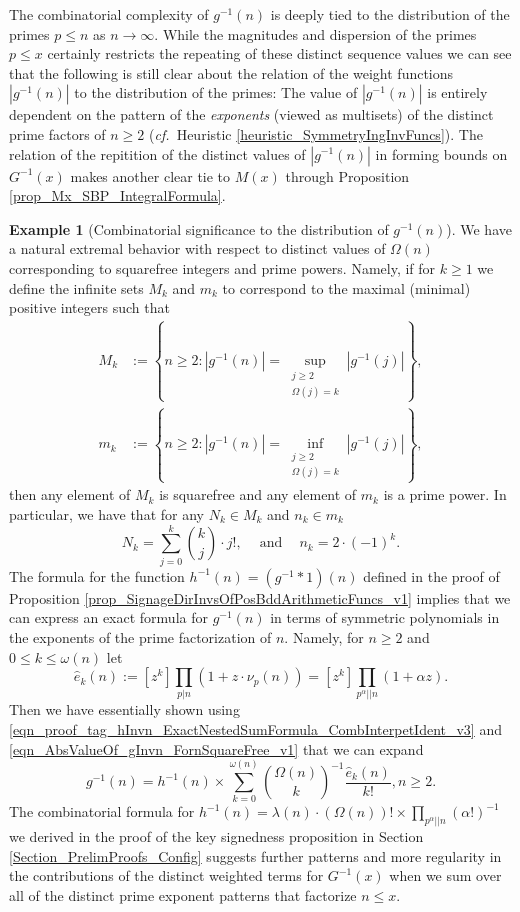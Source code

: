 \documentclass[11pt,reqno,a4letter]{article}
\numberwithin{figure}{section}
\numberwithin{table}{section}
\newcommand{\cf}{\textit{cf.\ }}
\theoremstyle{plain}
\numberwithin{theorem}{section}
\theoremstyle{definition}
\newtheorem{example}[theorem]{Example}
\begin{document}
The combinatorial complexity of $g^{-1}(n)$ is deeply tied to the distribution of the primes 
$p \leq n$ as $n \rightarrow \infty$. 
While the magnitudes and dispersion of the primes $p \leq x$ certainly restricts the 
repeating of these distinct sequence 
values we can see that the following 
is still clear about the relation of the weight functions $|g^{-1}(n)|$ to the 
distribution of the primes: 
The value of $|g^{-1}(n)|$ is entirely dependent on the pattern of the \emph{exponents} 
(viewed as multisets) of the distinct prime factors of $n \geq 2$ 
(\cf Heuristic \ref{heuristic_SymmetryIngInvFuncs}). 
The relation of the repitition of the distinct values 
of $|g^{-1}(n)|$ in forming bounds on $G^{-1}(x)$ makes another clear tie to 
$M(x)$ through Proposition \ref{prop_Mx_SBP_IntegralFormula}. 

\begin{example}[Combinatorial significance to the distribution of $g^{-1}(n)$] 
We have a natural extremal behavior with respect to distinct values of $\Omega(n)$ 
corresponding to squarefree integers and prime powers. Namely, if for $k \geq 1$ we define the 
infinite sets $M_k$ and $m_k$ to correspond to the maximal (minimal) positive integers such that 
\begin{align*} 
M_k & := \left\{n \geq 2: |g^{-1}(n)| = \underset{{\substack{j \geq 2 \\ \Omega(j) = k}}}{\operatorname{sup}} 
     |g^{-1}(j)|\right\}, \\  
m_k & := \left\{n \geq 2: |g^{-1}(n)| = \underset{{\substack{j \geq 2 \\ \Omega(j) = k}}}{\operatorname{inf}} 
     |g^{-1}(j)|\right\}, 
\end{align*} 
then any element of $M_k$ is squarefree and any element of $m_k$ is a prime power. 
In particular, we have that for any $N_k \in M_k$ and $n_k \in m_k$
\[
N_k = \sum_{j=0}^{k} \binom{k}{j} \cdot j!, \quad \mathrm{\ and\ } \quad n_k = 2 \cdot (-1)^{k}. 
\]
The formula for the function $h^{-1}(n) = (g^{-1} \ast 1)(n)$ defined in the proof of 
Proposition \ref{prop_SignageDirInvsOfPosBddArithmeticFuncs_v1} implies that we can express 
an exact formula for $g^{-1}(n)$ in terms of symmetric polynomials in the 
exponents of the prime factorization of $n$. 
Namely, for $n \geq 2$ and $0 \leq k \leq \omega(n)$ let 
\[
\widehat{e}_k(n) := [z^k] \prod_{p|n} (1 + z \cdot \nu_p(n)) = [z^k] \prod_{p^{\alpha} || n} (1 + \alpha z). 
\]
Then we have essentially shown using 
\eqref{eqn_proof_tag_hInvn_ExactNestedSumFormula_CombInterpetIdent_v3} and 
\eqref{eqn_AbsValueOf_gInvn_FornSquareFree_v1} that we can expand 
\[
g^{-1}(n) = h^{-1}(n) \times \sum_{k=0}^{\omega(n)} \binom{\Omega(n)}{k}^{-1} 
     \frac{\widehat{e}_k(n)}{k!}, n \geq 2. 
\]
The combinatorial formula for 
$h^{-1}(n) = \lambda(n) \cdot (\Omega(n))! \times \prod_{p^{\alpha} || n} (\alpha !)^{-1}$ 
we derived in the proof of the key signedness proposition in 
Section \ref{Section_PrelimProofs_Config} 
suggests further patterns and more regularity in the contributions of the distinct weighted 
terms for $G^{-1}(x)$ when we sum over all of the distinct prime exponent patterns that factorize 
$n \leq x$. 
\end{example} 
\end{document}

